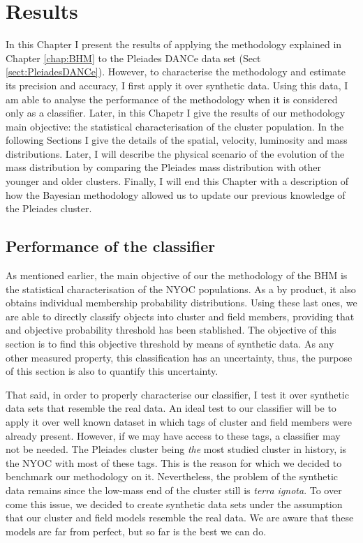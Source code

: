 \chapter{Results}
\label{chap:Results}
In this Chapter I present the results of applying the methodology explained in Chapter \ref{chap:BHM} to the Pleiades DANCe data set (Sect \ref{sect:PleiadesDANCe}). However, to characterise the methodology and estimate its precision and accuracy, I first apply it over synthetic data. Using this data, I am able to analyse the performance of the methodology when it is considered only as a classifier. Later, in this Chapetr I give the results of our methodology main objective: the statistical characterisation of the cluster population. In the following Sections I give the details of the spatial, velocity, luminosity and mass distributions. Later, I will describe the physical scenario of the evolution of the mass distribution by comparing the Pleiades mass distribution with other younger and older clusters. Finally, I will end this Chapter with a description of how the Bayesian methodology allowed us to update our previous knowledge of the Pleiades cluster.

\section{Performance of the classifier}
As mentioned earlier, the main objective of our the methodology of the BHM is the statistical characterisation of the NYOC populations. As a by product, it also obtains individual membership probability distributions. Using these last ones, we are able to directly classify objects into cluster and field members, providing that and objective probability threshold has been stablished. The objective of this section is to find this objective threshold by means of synthetic data. As any other measured property, this classification has an uncertainty, thus, the purpose of this section is also to quantify this uncertainty. 

That said, in order to properly characterise our classifier, I test it over synthetic data sets that resemble the real data. An ideal test to our classifier will be to apply it over well known dataset in which tags of cluster and field members were already present. However, if we may have access to these tags, a classifier may not be needed. The Pleiades cluster being \emph{the} most studied cluster in history, is the  NYOC with most of these tags. This is the reason for which we decided to benchmark our methodology on it. Nevertheless, the problem of the synthetic data remains since the low-mass end of the cluster still is \emph{terra ignota}. To over come this issue, we decided to create synthetic data sets under the assumption that our cluster and field models resemble the real data.  We are aware that these models are far from perfect, but so far is the best we can do. 

